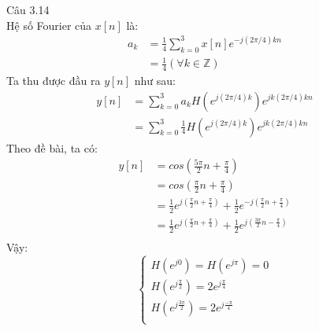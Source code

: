 \documentclass[11pt]{exam}
\begin{document}
\begin{questions}
\question Câu 3.14 \\
    Hệ số Fourier của $x[n]$ là:
    \begin{equation*}
        \begin{aligned}
            a_k &= \frac{1}{4}\sum_{k=0}^3{x[n]e^{-j(2\pi/4)kn}} \\
            &= \frac{1}{4} (\forall k \in \mathbb{Z})
        \end{aligned}
    \end{equation*}
    Ta thu được đầu ra $y[n]$ như sau:
    \begin{equation*}
        \begin{aligned}
            y[n] &= \sum_{k = 0}^3{a_k H(e^{j(2\pi/4)k})e^{jk(2\pi/4)kn}} \\
            &= \sum_{k = 0}^3{\frac{1}{4}H(e^{j(2\pi/4)k})e^{jk(2\pi/4)kn}}
        \end{aligned}
    \end{equation*}
    Theo đề bài, ta có:
    \begin{equation*}
        \begin{aligned}
            y[n] &= cos(\frac{5\pi}{2}n + \frac{\pi}{4}) \\
            &= cos(\frac{\pi}{2}n + \frac{\pi}{4}) \\
            &= \frac{1}{2}e^{j(\frac{\pi}{2}n + \frac{\pi}{4})} + \frac{1}{2}e^{-j(\frac{\pi}{2}n + \frac{\pi}{4})} \\
            &= \frac{1}{2}e^{j(\frac{\pi}{2}n + \frac{\pi}{4})} + \frac{1}{2}e^{j(\frac{3\pi}{2}n - \frac{\pi}{4})} \\
        \end{aligned}
    \end{equation*}
    Vậy:
    \begin{equation*}
        \begin{cases}
            H(e^{j0}) = H(e^{j\pi}) = 0 \\
            H(e^{j\frac{\pi}{2}}) = 2e^{j\frac{\pi}{4}} \\
            H(e^{j\frac{3\pi}{2}}) = 2e^{j\frac{-\pi}{4}} \\
        \end{cases}
    \end{equation*}


\end{questions}
\end{document}
